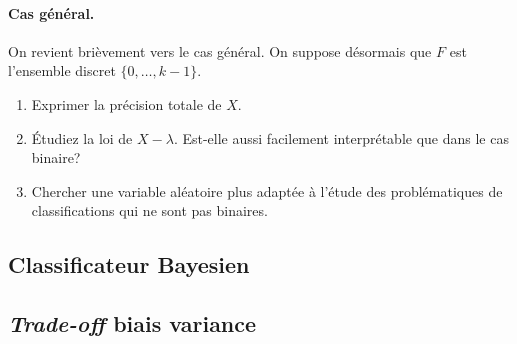 \documentclass[11pt, a4paper]{article}
\begin{document}
\paragraph{Cas général.} On revient brièvement vers le cas général. On
suppose désormais que $F$ est l'ensemble discret $\{0, \ldots, k-1\}$.
\begin{question}
  \begin{enumerate}
  \item Exprimer la précision totale de $X$.
  \item Étudiez la loi de $X-\lambda$. Est-elle aussi facilement
    interprétable que dans le cas binaire?
  \item Chercher une variable aléatoire plus adaptée à l'étude des
    problématiques de classifications qui ne sont pas binaires.
  \end{enumerate}
\end{question}


\subsection{Classificateur Bayesien}
\label{sec:Bayesien}

\subsection{\emph{Trade-off} biais variance}
\label{sec:biaisVariance}





\end{document}
